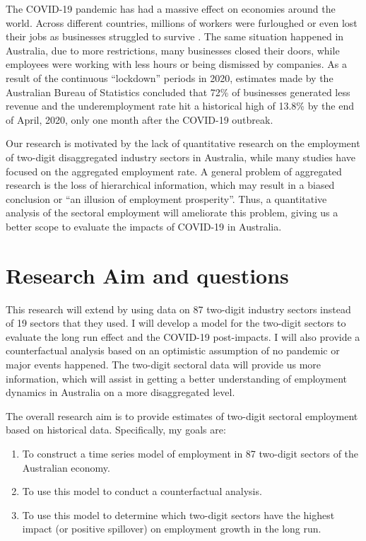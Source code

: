 \documentclass{monashthesis}
\begin{document}
The COVID-19 pandemic has had a massive effect on economies around the world. Across different countries, millions of workers were furloughed or even lost their jobs as businesses struggled to survive \autocite{ny2020}. The same situation happened in Australia, due to more restrictions, many businesses closed their doors, while employees were working with less hours or being dismissed by companies. As a result of the continuous ``lockdown'' periods in 2020, estimates made by the Australian Bureau of Statistics \autocite{ABS2021} concluded that 72\% of businesses generated less revenue and the underemployment rate hit a historical high of 13.8\% by the end of April, 2020, only one month after the COVID-19 outbreak.

Our research is motivated by the lack of quantitative research on the employment of two-digit disaggregated industry sectors in Australia, while many studies have focused on the aggregated employment rate. A general problem of aggregated research is the loss of hierarchical information, which may result in a biased conclusion or ``an illusion of employment prosperity''. Thus, a quantitative analysis of the sectoral employment will ameliorate this problem, giving us a better scope to evaluate the impacts of COVID-19 in Australia.

\hypertarget{research-aim-and-questions}{%
\section{Research Aim and questions}\label{research-aim-and-questions}}

This research will extend \textcite{anderson2020} by using data on 87 two-digit industry sectors instead of 19 sectors that they used. I will develop a model for the two-digit sectors to evaluate the long run effect and the COVID-19 post-impacts. I will also provide a counterfactual analysis based on an optimistic assumption of no pandemic or major events happened. The two-digit sectoral data will provide us more information, which will assist in getting a better understanding of employment dynamics in Australia on a more disaggregated level.

The overall research aim is to provide estimates of two-digit sectoral employment based on historical data. Specifically, my goals are:

\begin{enumerate}
\def\labelenumi{\arabic{enumi}.}
\item
  To construct a time series model of employment in 87 two-digit sectors of the Australian economy.
\item
  To use this model to conduct a counterfactual analysis.
\item
  To use this model to determine which two-digit sectors have the highest impact (or positive spillover) on employment growth in the long run.
\end{enumerate}
\end{document}
